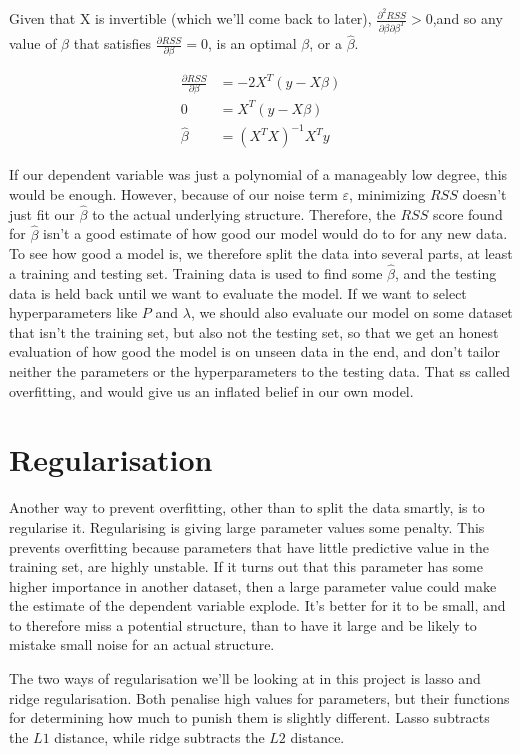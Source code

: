 \documentclass[11pt, a4paper]{report}
\begin{document}
Given that X is invertible (which we'll come back to later), $\frac{\partial^2 RSS}{\partial \beta \partial \beta^T} > 0$,and so any value of $\beta$ that satisfies $\frac{\partial RSS}{\partial{\beta}}=0$, is an optimal $\beta$, or a $\hat{\beta}$.

\begin{align}
\frac{\partial RSS}{\partial{\beta}} &= -2 X^T (y - X \beta) \\
0 &= X^T (y - X \beta) \\
\hat{\beta} &= (X^T X)^{-1} X^T y
\end{align}

If our dependent variable was just a polynomial of a manageably low degree, this would be enough. However, because of our noise term $\varepsilon$, minimizing $RSS$ doesn't just fit our $\hat{\beta}$ to the actual underlying structure. Therefore, the $RSS$ score found for $\hat{\beta}$ isn't a good estimate of how good our model would do to for any new data. To see how good a model is, we therefore split the data into several parts, at least a training and testing set. Training data is used to find some $\hat{\beta}$, and the testing data is held back until we want to evaluate the model. If we want to select hyperparameters like $P$ and $\lambda$, we should also evaluate our model on some dataset that isn't the training set, but also not the testing set, so that we get an honest evaluation of how good the model is on unseen data in the end, and don't tailor neither the parameters or the hyperparameters to the testing data. That ss called overfitting, and would give us an inflated belief in our own model.

\section{Regularisation}

Another way to prevent overfitting, other than to split the data smartly, is to regularise it. Regularising is giving large parameter values some penalty. This prevents overfitting because parameters that have little predictive value in the training set, are highly unstable. If it turns out that this parameter has some higher importance in another dataset, then a large parameter value could make the estimate of the dependent variable explode. It's better for it to be small, and to therefore miss a potential structure, than to have it large and be likely to mistake small noise for an actual structure.

The two ways of regularisation we'll be looking at in this project is lasso and ridge regularisation. Both penalise high values for parameters, but their functions for determining how much to punish them is slightly different. Lasso subtracts the $L1$ distance, while ridge subtracts the $L2$ distance.
\end{document}
